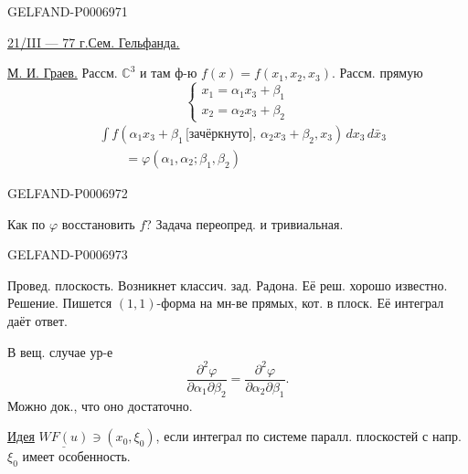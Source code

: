 \begin{GelfandAdjacentEvidence}{GELFAND-P000697}{1}

\underline{21/III --- 77 г.}\qquad\underline{\underline{Сем. Гельфанда.}}

\underline{М. И. Граев.}
Рассм. \(\mathbb C^3\) и там ф-ю \(f(x)=f(x_1,x_2,x_3)\).
Рассм. прямую
\[
\begin{cases}
x_1=\alpha_1x_3+\beta_1\\
x_2=\alpha_2x_3+\beta_2
\end{cases}
\]
\[
\begin{aligned}
&\int f(\alpha_1x_3+\beta_1\,\text{[зачёркнуто]},\,
\alpha_2x_3+\beta_2,x_3)\,dx_3\,d\bar{x}_3\\
&\qquad=\varphi(\alpha_1,\alpha_2;\beta_1,\beta_2)
\end{aligned}
\]
\end{GelfandAdjacentEvidence}
\begin{GelfandAdjacentEvidence}{GELFAND-P000697}{2}

Как по \(\varphi\) восстановить \(f\)? Задача переопред. и тривиальная.

\end{GelfandAdjacentEvidence}
\begin{GelfandAdjacentEvidence}{GELFAND-P000697}{3}

Провед. плоскость. Возникнет классич. зад. Радона. Её реш. хорошо известно.
Решение. Пишется \((1,1)\)-форма на мн-ве прямых, кот. в плоск.
Её интеграл даёт ответ.

В вещ. случае ур-е
\[
\frac{\partial^2\varphi}{\partial\alpha_1\partial\beta_2}
=\frac{\partial^2\varphi}{\partial\alpha_2\partial\beta_1}.
\]
Можно док., что оно достаточно.

\underline{Идея}
\(\underline{WF(u)}\ni(x_0,\xi_0)\), если интеграл по системе паралл. плоскостей с напр. \(\xi_0\) имеет особенность.
\end{GelfandAdjacentEvidence}
